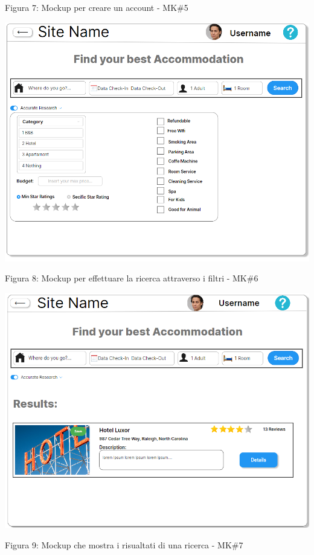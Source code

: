 \documentclass[10pt]{article}
\begin{document}
\begin{center}
\label{mk5}
\par\medskip
\par\medskip
Figura 7: Mockup per creare un account - MK\#5
\par\medskip
\par\medskip
{}
\includegraphics[scale=0.55]{Mockup/MockupResearch}
\label{mk6}
\par\medskip
Figura 8: Mockup per effettuare la ricerca attraverso i filtri - MK\#6
\par\medskip
{}
\includegraphics[scale=0.6]{Mockup/MockupResult}
\label{mk7}
\par\medskip
Figura 9: Mockup che mostra i risualtati di una ricerca - MK\#7
\par\medskip
\end{center}
\end{document}
